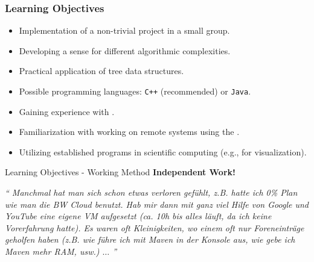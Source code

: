 \begin{frame}
  \frametitle{Learning Objectives}
  \begin{itemize}
    \item Implementation of a non-trivial project in a small group.
    \item Developing a sense for different algorithmic complexities.
    \item Practical application of tree data structures.
    \item Possible programming languages: \texttt{C++} (recommended) or \texttt{Java}.
    \item Gaining experience with .
    \item Familiarization with working on remote systems using the .
    \item Utilizing established programs in scientific computing (e.g.,  for visualization).
  \end{itemize}
\end{frame}

\begin{frame}{Learning Objectives - Working Method}
\centering
{\Large\textbf{Independent Work!}}

\vfill
\pause
\textit{\enquote{%
    Manchmal hat man sich schon etwas verloren gefühlt, z.B. hatte ich 0\% Plan wie man die BW Cloud benutzt. Hab mir dann mit ganz viel Hilfe von Google und YouTube eine eigene VM aufgesetzt (ca. 10h bis alles läuft, da ich keine Vorerfahrung hatte). Es waren oft Kleinigkeiten, wo einem oft nur Foreneinträge geholfen haben (z.B. wie führe ich mit Maven in der Konsole aus, wie gebe ich Maven mehr RAM, usw.) $\dots$%
}}

\vfill

\end{frame}

